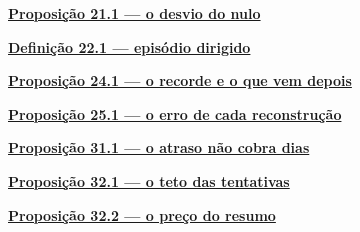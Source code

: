\noindent\hyperref[prop:nulo-da-direcao]{\textbf{Proposição 21.1 --- o desvio do nulo}}\dotfill\ \pageref{prop:nulo-da-direcao}\par
\noindent\hyperref[def:episodio]{\textbf{Definição 22.1 --- episódio dirigido}}\dotfill\ \pageref{def:episodio}\par
\noindent\hyperref[prop:recorde]{\textbf{Proposição 24.1 --- o recorde e o que vem depois}}\dotfill\ \pageref{prop:recorde}\par
\noindent\hyperref[prop:reconstrucao]{\textbf{Proposição 25.1 --- o erro de cada reconstrução}}\dotfill\ \pageref{prop:reconstrucao}\par
\noindent\hyperref[prop:atraso-parado]{\textbf{Proposição 31.1 --- o atraso não cobra dias}}\dotfill\ \pageref{prop:atraso-parado}\par
\noindent\hyperref[prop:teto-tentativas]{\textbf{Proposição 32.1 --- o teto das tentativas}}\dotfill\ \pageref{prop:teto-tentativas}\par
\noindent\hyperref[prop:preco-do-resumo]{\textbf{Proposição 32.2 --- o preço do resumo}}\dotfill\ \pageref{prop:preco-do-resumo}\par
